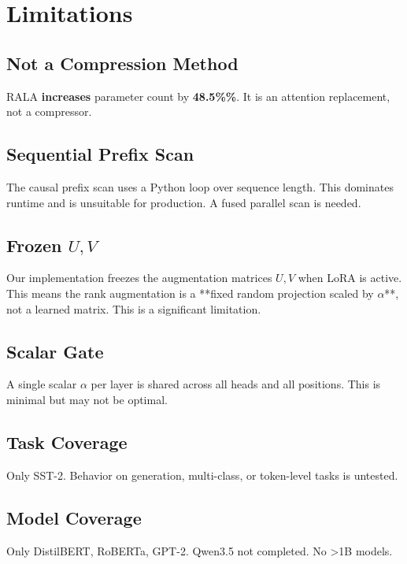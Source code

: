 
\section{Limitations}

\subsection{Not a Compression Method}

RALA \textbf{increases} parameter count by \textbf{48.5\%\%}. It is an 
attention replacement, not a compressor.

\subsection{Sequential Prefix Scan}

The causal prefix scan uses a Python loop over sequence length. This 
dominates runtime and is unsuitable for production. A fused parallel scan 
is needed.

\subsection{Frozen $U, V$}

Our implementation freezes the augmentation matrices $U, V$ when LoRA is 
active. This means the rank augmentation is a **fixed random projection 
scaled by $\alpha$**, not a learned matrix. This is a significant 
limitation.

\subsection{Scalar Gate}

A single scalar $\alpha$ per layer is shared across all heads and all 
positions. This is minimal but may not be optimal.

\subsection{Task Coverage}

Only SST-2. Behavior on generation, multi-class, or token-level tasks is 
untested.

\subsection{Model Coverage}

Only DistilBERT, RoBERTa, GPT-2. Qwen3.5 not completed. No \textgreater{}1B models.

